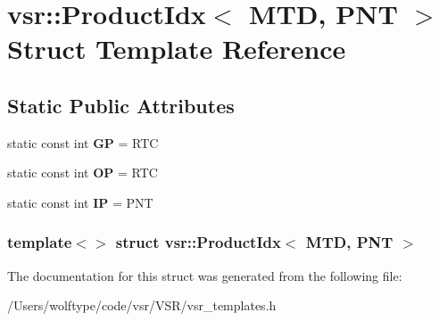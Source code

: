 \hypertarget{structvsr_1_1_product_idx_3_01_m_t_d_00_01_p_n_t_01_4}{\section{vsr\-:\-:Product\-Idx$<$ M\-T\-D, P\-N\-T $>$ Struct Template Reference}
\label{structvsr_1_1_product_idx_3_01_m_t_d_00_01_p_n_t_01_4}
}
\subsection*{Static Public Attributes}
\begin{DoxyCompactItemize}
\item 
\hypertarget{structvsr_1_1_product_idx_3_01_m_t_d_00_01_p_n_t_01_4_a40f310714725f5eb15f2c75b92f3b357}{static const int {\bfseries G\-P} = R\-T\-C}\label{structvsr_1_1_product_idx_3_01_m_t_d_00_01_p_n_t_01_4_a40f310714725f5eb15f2c75b92f3b357}

\item 
\hypertarget{structvsr_1_1_product_idx_3_01_m_t_d_00_01_p_n_t_01_4_a9284e1939e2962f1cca3dc21a1f632ad}{static const int {\bfseries O\-P} = R\-T\-C}\label{structvsr_1_1_product_idx_3_01_m_t_d_00_01_p_n_t_01_4_a9284e1939e2962f1cca3dc21a1f632ad}

\item 
\hypertarget{structvsr_1_1_product_idx_3_01_m_t_d_00_01_p_n_t_01_4_a96b493a964fbb4aadeb698ecf974c70b}{static const int {\bfseries I\-P} = P\-N\-T}\label{structvsr_1_1_product_idx_3_01_m_t_d_00_01_p_n_t_01_4_a96b493a964fbb4aadeb698ecf974c70b}

\end{DoxyCompactItemize}
\subsubsection*{template$<$$>$ struct vsr\-::\-Product\-Idx$<$ M\-T\-D, P\-N\-T $>$}



The documentation for this struct was generated from the following file\-:\begin{DoxyCompactItemize}
\item 
/\-Users/wolftype/code/vsr/\-V\-S\-R/vsr\-\_\-templates.\-h\end{DoxyCompactItemize}
